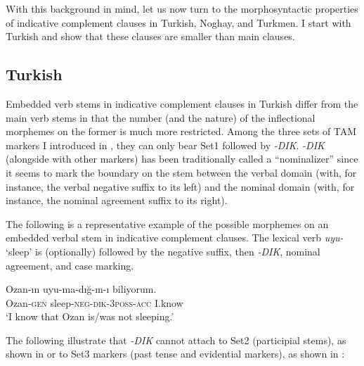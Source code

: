 \documentclass[output=paper]{langsci/langscibook}
\begin{document}
With this background in mind, let us now turn to the morphosyntactic properties of indicative complement clauses in Turkish, Noghay, and Turkmen. 
I start with Turkish and show that these clauses are smaller than main clauses.

\subsection{Turkish}
\label{kelepirsec:key:2.2}

Embedded verb stems in indicative complement clauses in Turkish differ from the main verb stems in that the number 
(and the nature) of the inflectional morphemes on the former is much more restricted. 
Among the three sets of TAM markers I introduced in , they can only bear Set1 followed by \textit{-DIK}. 
\textit{-DIK} (alongside with other markers) has been traditionally called a ``nominalizer'' 
since it seems to mark the boundary on the stem between the verbal domain (with, for instance, the verbal negative suffix to its left) 
and the nominal domain (with, for instance, the nominal agreement suffix to its right). 

The following is a representative example of the possible morphemes on an embedded verbal stem in indicative complement clauses. 
The lexical verb \textit{uyu-} `sleep' is (optionally) followed by the negative suffix, then \textit{-DIK}, nominal agreement, and case marking.

\ea%
    \label{kelepirex:key:11}
    \gll Ozan-ın uyu-ma-dığ-ın-ı biliyorum.\\
    Ozan-\textsc{gen} sleep-\textsc{neg}{}-\textsc{dik}{}-\textsc{3poss}{}-\textsc{acc} I.know\\
    \glt   `I know that Ozan is/was not sleeping.'
    \z

The following illustrate that \textit{-DIK} cannot attach to Set2 (participial stems), as shown in  
or to Set3 markers (past tense and evidential markers), as shown in :
\end{document}
